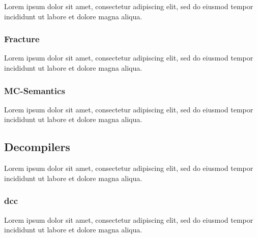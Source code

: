 \documentclass[12pt, a4paper]{article}
\begin{document}
Lorem ipsum dolor sit amet, consectetur adipiscing elit, sed do eiusmod tempor incididunt ut labore et dolore magna aliqua.


\subsubsection{Fracture}

Lorem ipsum dolor sit amet, consectetur adipiscing elit, sed do eiusmod tempor incididunt ut labore et dolore magna aliqua.


\subsubsection{MC-Semantics}


Lorem ipsum dolor sit amet, consectetur adipiscing elit, sed do eiusmod tempor incididunt ut labore et dolore magna aliqua.


\subsection{Decompilers}

Lorem ipsum dolor sit amet, consectetur adipiscing elit, sed do eiusmod tempor incididunt ut labore et dolore magna aliqua.


\subsubsection{dcc}

Lorem ipsum dolor sit amet, consectetur adipiscing elit, sed do eiusmod tempor incididunt ut labore et dolore magna aliqua.

\cite{rev_comp}

\end{document}
